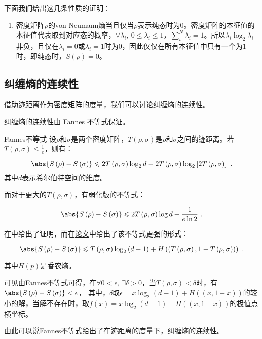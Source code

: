 下面我们给出这几条性质的证明：

\begin{enumerate}
\item 密度矩阵$\rho$的von Neumann熵当且仅当$\rho$表示纯态时为0。密度矩阵的本征值的本征值代表取到对应态的概率，$\forall \lambda_i ,~ 0\leqslant \lambda_i \leqslant1$，$\sum_i^N \lambda_i = 1$。所以$\lambda_i \log_2 \lambda_i$非负，且仅在$\lambda_i = 0$或$\lambda_i = 1$时为$0$，因此仅仅在所有本征值中只有一个为$1$时，即纯态时，$S\left(\rho\right) = 0$。
\end{enumerate}


\subsection{纠缠熵的连续性}

借助迹距离作为密度矩阵的度量，我们可以讨论纠缠熵的连续性。

纠缠熵的连续性由 Fannes 不等式保证。

\begin{theorem}{Fannes不等式}
设$\rho$和$\sigma$是两个密度矩阵，$T\left(\rho,\sigma\right)$是$\rho$和$\sigma$之间的迹距离。若$T\left(\rho,\sigma\right) \leqslant \frac{1}{e}$，则有：

\begin{equation}
\abs{S\left(\rho\right) - S\left(\sigma\right)} \leqslant 2T\left(\rho,\sigma\right)\log_2 d - 2T\left(\rho,\sigma\right) \log_2\left[ 2 T\left(\rho,\sigma\right)\right]~.
\end{equation}
其中$d$表示希尔伯特空间的维度。

\end{theorem}

而对于更大的$T\left(\rho,\sigma\right)$，有弱化版的不等式：

\begin{equation}
\abs{S\left(\rho\right) - S\left(\sigma\right)} \leqslant 2 T\left(\rho,\sigma\right)\log d + \frac{1}{e\ln 2}~.
\end{equation}

在\cite{量子信息}中给出了证明，而在\href{https://arxiv.org/pdf/quant-ph/0610146.pdf}{论文}中给出了该不等式更强的形式：

\begin{equation}
\abs{S\left(\rho\right) - S\left(\sigma\right)} \leqslant T\left(\rho,\sigma\right)\log_2\left(d-1\right) + H\left(\left(T\left(\rho,\sigma\right),1-T\left(\rho,\sigma\right)\right)\right)~.
\end{equation}

其中$H(p)$是香农熵。

可见由Fannes不等式可得，在$\forall 0<\epsilon,~\exists \delta>0$，当$T\left(\rho,\sigma\right)<\delta$时，有$\abs{S\left(\rho\right) - S\left(\sigma\right)}<\epsilon$，
其中，$\delta$取$\epsilon = x\log_2\left(d-1\right) + H\left(\left(x,1-x\right)\right)$的较小的解，当解不存在时，取$f(x)=x\log_2\left(d-1\right) + H\left(\left(x,1-x\right)\right)$的极值点横坐标。

由此可以说Fannes不等式给出了在迹距离的度量下，纠缠熵的连续性。